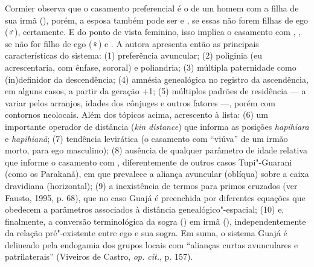 Cormier observa que o casamento preferencial é o de um homem com a filha
de sua irmã (), porém, a esposa também pode ser  e , se essas
não forem filhas de ego (♂), certamente. E do ponto de vista feminino,
isso implica o casamento com , , se não for filho de ego (♀) e
. A autora apresenta então as principais características do sistema:
(1) preferência avuncular; (2) poliginia (eu acrescentaria, com ênfase,
sororal) e poliandria; (3) múltipla paternidade como (in)definidor da
descendência; (4) amnésia genealógica no registro da ascendência, em
alguns casos, a partir da geração +1; (5) múltiplos padrões de
residência --- a variar pelos arranjos, idades dos cônjuges e outros
fatores ---, porém com contornos neolocais. Além dos tópicos acima,
acrescento à lista: (6) um importante operador de distância (\emph{kin
distance}) que informa as posições \emph{hapihiara} e \emph{hapihianã};
(7) tendência levirática (o casamento com ``viúva'' de um irmão morto,
para ego masculino); (8) ausência de qualquer parâmetro de idade
relativa que informe o casamento com , diferentemente de outros casos
Tupi"-Guarani (como os Parakanã), em que prevalece a aliança avuncular
(oblíqua) sobre a caixa dravidiana (horizontal); (9) a inexistência de
termos para primos cruzados (ver Fausto, 1995, p. 68), que no caso Guajá
é preenchida por diferentes equações que obedecem a parâmetros
associados à distância genealógico"-espacial; (10) e, finalmente, a
conversão terminológica da sogra () em irmã (), independentemente da
relação pré"-existente entre ego e sua sogra. Em suma, o sistema Guajá é
delineado pela endogamia dos grupos locais com ``alianças curtas
avunculares e patrilaterais'' (Viveiros de Castro, \emph{op. cit.}, p. 157).

